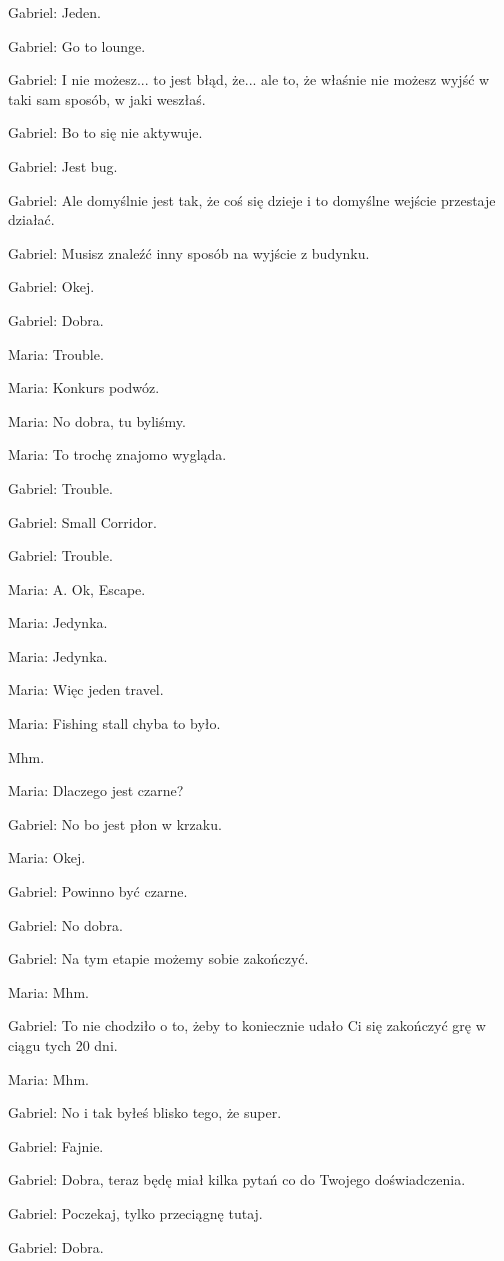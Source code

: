 Gabriel: Jeden.

Gabriel: Go to lounge.

Gabriel: I nie możesz... to jest błąd, że... ale to, że właśnie nie możesz wyjść w taki sam sposób, w jaki weszłaś.

Gabriel: Bo to się nie aktywuje.

Gabriel: Jest bug.

Gabriel: Ale domyślnie jest tak, że coś się dzieje i to domyślne wejście przestaje działać.

Gabriel: Musisz znaleźć inny sposób na wyjście z budynku.

Gabriel: Okej.

Gabriel: Dobra.

Maria: Trouble.

Maria: Konkurs podwóz.

Maria: No dobra, tu byliśmy.

Maria: To trochę znajomo wygląda.

Gabriel: Trouble.

Gabriel: Small Corridor.

Gabriel: Trouble.

Maria: A. Ok, Escape.

Maria: Jedynka.

Maria: Jedynka.

Maria: Więc jeden travel.

Maria: Fishing stall chyba to było.

Mhm.

Maria: Dlaczego jest czarne?

Gabriel: No bo jest płon w krzaku.

Maria: Okej.

Gabriel: Powinno być czarne.

Gabriel: No dobra.

Gabriel: Na tym etapie możemy sobie zakończyć.

Maria: Mhm.

Gabriel: To nie chodziło o to, żeby to koniecznie udało Ci się zakończyć grę w ciągu tych 20 dni.

Maria: Mhm.

Gabriel: No i tak byłeś blisko tego, że super.

Gabriel: Fajnie.

Gabriel: Dobra, teraz będę miał kilka pytań co do Twojego doświadczenia.

Gabriel: Poczekaj, tylko przeciągnę tutaj.

Gabriel: Dobra.

